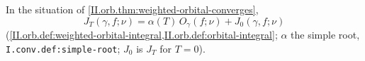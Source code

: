 In the situation of \cref{II.orb.thm:weighted-orbital-converges},
\[
  J_T(\gamma,f;\nu)=\alpha(T)\,O_\gamma(f;\nu)+J_0(\gamma,f;\nu)
\]
(\cref{II.orb.def:weighted-orbital-integral,II.orb.def:orbital-integral}; $\alpha$ the simple root, \texttt{I.conv.def:simple-root}; $J_0$ is $J_T$ for $T=0$).
